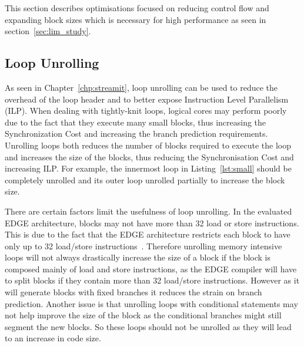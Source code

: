This section describes optimisations focused on reducing control flow and expanding block sizes which is necessary for high performance as seen in section~\ref{sec:lim_study}.

\subsection{Loop Unrolling}
As seen in Chapter~\ref{chp:streamit}, loop unrolling can be used to reduce the overhead of the loop header and to better expose Instruction Level Parallelism (ILP).
When dealing with tightly-knit loops, logical cores may perform poorly due to the fact that they execute many small blocks, thus increasing the Synchronization Cost and increasing the branch prediction requirements.
Unrolling loops both reduces the number of blocks required to execute the loop and increases the size of the blocks, thus reducing the Synchronisation Cost and increasing ILP.
For example, the innermost loop in Listing~\ref{lst:small} should be completely unrolled and its outer loop unrolled partially to increase the block size.

There are certain factors limit the usefulness of loop unrolling.
In the evaluated EDGE architecture, blocks may not have more than 32 load or store instructions.
This is due to the fact that the EDGE architecture restricts each block to have only up to 32 load/store instructions~\cite{putnam2010e2,smith2006edge}.
Therefore unrolling memory intensive loops will not always drastically increase the size of a block if the block is composed mainly of load and store instructions, as the EDGE compiler will have to split blocks if they contain more than 32 load/store instructions.
However as it will generate blocks with fixed branches it reduces the strain on branch prediction.
Another issue is that unrolling loops with conditional statements may not help improve the size of the block as the conditional branches might still segment the new blocks.
So these loops should not be unrolled as they will lead to an increase in code size.


